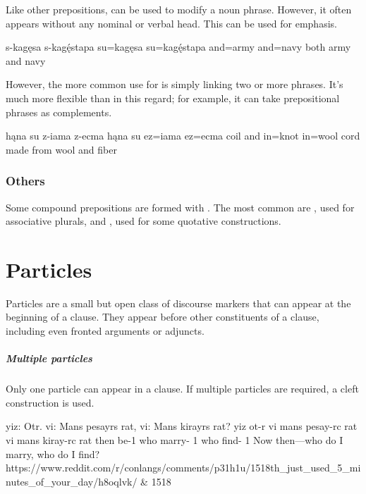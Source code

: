 Like other prepositions,  can be used to modify a noun phrase. However, it often appears without any nominal or verbal head. This can be used for emphasis.

\begin{example}
    \script s-kagęsa s-kagę́stapa
    \bits su=kagęsa su=kagę́stapa
    \gloss and=army and=navy
    \tr both army and navy
\end{example}

However, the more common use for  is simply linking two or more phrases. It's much more flexible than  in this regard; for example, it can take prepositional phrases as complements.

\begin{example}
    \script hąna su z-iama z-ecma
    \bits hąna su ez=iama ez=ecma
    \gloss coil and in=knot in=wool
    \tr cord made from wool and fiber
\end{example}

\subsection{Others}
Some compound prepositions are formed with . The most common are , used for associative plurals, and , used for some quotative constructions.

\setchapterpreamble[u]{\margintoc}
\chapter{Particles}
Particles are a small but open class of discourse markers that can appear at the beginning of a clause. They appear before other constituents of a clause, including even fronted arguments or adjuncts.

\paragraph{Multiple particles}
Only one particle can appear in a clause. If multiple particles are required, a cleft construction is used.

\begin{example*}
    \script yiz: Otr. vi: Mans pesayrs rat, vi: Mans kirayrs rat?
    \bits  yiz ot-r vi mans pesay-rc rat vi mans kiray-rc rat
    \gloss then be-{1}  who marry- {1}  who find- {1}
    \tr Now then---who do I marry, who do I find?
    \smoyd https://www.reddit.com/r/conlangs/comments/p31h1u/1518th_just_used_5_minutes_of_your_day/h8oqlvk/ & 1518
\end{example*}  

